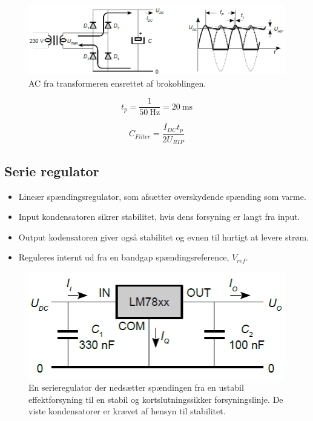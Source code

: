 \documentclass[danish]{article}
\begin{document}
\begin{figure} [H]
	\centering
	\includegraphics[width=\linewidth]{graphics/ensretter}
	\caption{AC fra transformeren ensrettet af brokoblingen.}
	\label{fig:ensretter}
\end{figure}


\begin{equation}
t_p = \dfrac{1}{\SI{50}{\hertz}} = \SI{20}{\milli\second}
\end{equation}

\begin{equation}
C_{Filter} = \dfrac{I_{DC}t_p}{2 U_{RIP}}
\end{equation}

\subsection{Serie regulator}
\begin{itemize}
	\item Lineær spændingsregulator, som afsætter overskydende spænding som varme.
	\item Input kondensatoren sikrer stabilitet, hvis dens forsyning er langt fra input.
	\item Output kodensatoren giver også stabilitet og evnen til hurtigt at levere strøm.
	\item Reguleres internt ud fra en bandgap spændingsreference, $V_{ref}$.
\end{itemize}

\begin{figure} [H]
	\centering
	\includegraphics[width=0.8\linewidth]{graphics/serieregulator}
	\caption{En serieregulator der nedsætter spændingen fra en ustabil
		effektforsyning til en stabil og kortslutningssikker forsyningslinje. De viste kondensatorer er
		krævet af hensyn til stabilitet.}
	\label{fig:serieregulator}
\end{figure}
\end{document}
